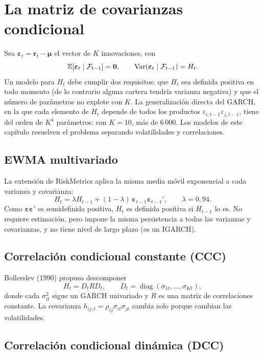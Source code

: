 \section{La matriz de covarianzas condicional}

Sea $\boldsymbol\varepsilon_t=\mathbf r_t-\boldsymbol\mu$ el vector de $K$ innovaciones, con
\[
  \mathbb{E}[\boldsymbol\varepsilon_t\mid\mathcal F_{t-1}]=\mathbf 0,\qquad
  \operatorname{Var}(\boldsymbol\varepsilon_t\mid\mathcal F_{t-1})=H_t .
\]
Un modelo para $H_t$ debe cumplir dos requisitos: que $H_t$ sea definida positiva en todo momento (de lo
contrario alguna cartera tendría varianza negativa) y que el número de parámetros no explote con $K$. La
generalización directa del GARCH, en la que cada elemento de $H_t$ depende de todos los productos
$\varepsilon_{i,t-1}\varepsilon_{j,t-1}$, tiene del orden de $K^4$ parámetros: con $K=10$, más de 6\,000. Los
modelos de este capítulo resuelven el problema separando volatilidades y correlaciones.

\subsection{EWMA multivariado}

La extensión de RiskMetrics aplica la misma media móvil exponencial a cada varianza y covarianza:
\[
  H_t=\lambda H_{t-1}+(1-\lambda)\,\boldsymbol\varepsilon_{t-1}\boldsymbol\varepsilon_{t-1}',\qquad\lambda=0{,}94 .
\]
Como $\boldsymbol\varepsilon\boldsymbol\varepsilon'$ es semidefinida positiva, $H_t$ es definida positiva si
$H_{t-1}$ lo es. No requiere estimación, pero impone la misma persistencia a todas las varianzas y covarianzas,
y no tiene nivel de largo plazo (es un IGARCH).

\subsection{Correlación condicional constante (CCC)}

Bollerslev (1990) propuso descomponer
\[
  H_t=D_tRD_t,\qquad D_t=\operatorname{diag}(\sigma_{1t},\dots,\sigma_{Kt}),
\]
donde cada $\sigma_{it}^2$ sigue un GARCH univariado y $R$ es una matriz de correlaciones constante. La covarianza
$h_{ij,t}=\rho_{ij}\sigma_{it}\sigma_{jt}$ cambia solo porque cambian las volatilidades.

\subsection{Correlación condicional dinámica (DCC)}

